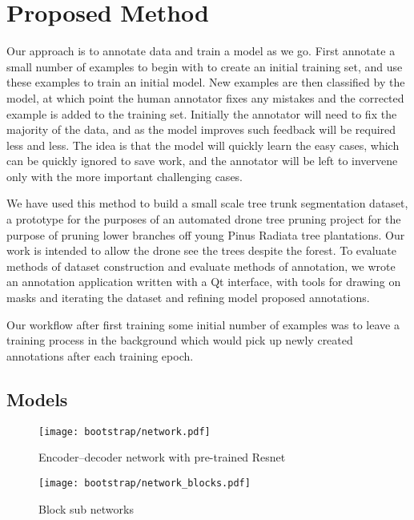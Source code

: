 




\section{Proposed Method}

Our approach is to annotate data and train a model as we go. First annotate a small number of examples to begin with to create an initial training set, and use these examples to train an initial model. New examples are then classified by the model, at which point the human annotator fixes any mistakes and the corrected example is added to the training set. Initially the annotator will need to fix the majority of the data, and as the model improves such feedback will be required less and less. The idea is that the model will quickly learn the easy cases, which can be quickly ignored to save work, and the annotator will be left to invervene only with the more important challenging cases.

We have used this method to build a small scale tree trunk segmentation dataset, a prototype for the purposes of an automated drone tree pruning project for the purpose of pruning lower branches off young Pinus Radiata tree plantations. Our work is intended to allow the drone see the trees despite the forest. To evaluate methods of dataset construction and evaluate methods of annotation, we wrote an annotation application written with a Qt interface, with tools for drawing on masks and iterating the dataset and refining model proposed annotations.

Our workflow after first training some initial number of examples was to leave a training process in the background which would pick up newly created annotations after each training epoch. 


\subsection {Models}

\begin{figure}[h]
  \centering
  \texttt{[image: bootstrap/network.pdf]}
  \caption{Encoder--decoder network with pre-trained Resnet}  
  \label{fig:bootstrap_network}
\end{figure}
\begin{figure}
  \centering
  \texttt{[image: bootstrap/network\_blocks.pdf]}
  \caption{Block sub networks}  
  \label{fig:bootstrap_decode_block}
\end{figure}

